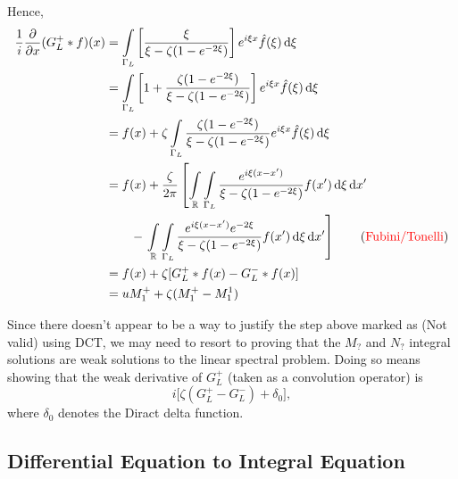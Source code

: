 \documentclass[../dissertation.tex]{subfiles}
\begin{document}
Hence, 
\begin{align*}
	\frac{1}{i} \frac{\partial}{\partial x} (G_L^+ * f)(x)
		&=\mathop{\int}_{{\Gamma_L}} 
				\left[
					\frac{\xi}{\xi-\zeta(1-e^{-2\xi})}
				\right]
				e^{i\xi x} \hat f(\xi)
			\, \mathrm{d}\xi \\
		&=\mathop{\int}_{{\Gamma_L}} 
				\left[
					1 + \frac{\zeta(1-e^{-2\xi})}{\xi-\zeta(1-e^{-2\xi})}
				\right]
				e^{i\xi x} \hat f(\xi)
			\, \mathrm{d}\xi \\
		&=f(x) +
			\zeta 
			\mathop{\int}_{{\Gamma_L}} 
				\frac{\zeta(1-e^{-2\xi})}{\xi-\zeta(1-e^{-2\xi})} e^{i\xi x} \hat f(\xi)
			\, \mathrm{d}\xi \\
		&= f(x) + 
			\frac{\zeta}{2\pi}
			\left[
				\mathop{\int}_{\mathbb R}
					\mathop{\int}_{{\Gamma_L}} 
						\frac{e^{i\xi(x-x')}}{\xi-\zeta(1-e^{-2\xi})} f(x') 
					\, \mathrm{d}\xi
				\, \mathrm{d}x' \right.\\
		&\qquad -
				\left.
				\mathop{\int}_{\mathbb R}
					\mathop{\int}_{{\Gamma_L}} 
						\frac{e^{i\xi(x-x')}e^{-2\xi}}{\xi-\zeta(1-e^{-2\xi})} f(x') 
					\, \mathrm{d}\xi
				\, \mathrm{d}x'
			\right] \qquad (\text{\color{red} Fubini/Tonelli})\\
		&= f(x) + \zeta[G_L^+*f(x)-G_L^-*f(x)] \\
		&= uM_1^+ + \zeta(M_1^+ - M_1^1)
\end{align*}

Since there doesn't appear to be a way to justify the step above marked as 
({\color{red}Not valid}) using DCT, we may need to resort to proving that 
the $M_?$ and $N_?$ integral solutions are weak solutions to the 
linear spectral problem. Doing so means showing that the weak derivative of 
$G_L^+$ (taken as a convolution operator) is
\[
	i \big[\zeta(G_L^+ - G_L^-) + \delta_0],
\]
where $\delta_0$ denotes the Diract delta function. 

\subsection{Differential Equation to Integral Equation}
\end{document}
